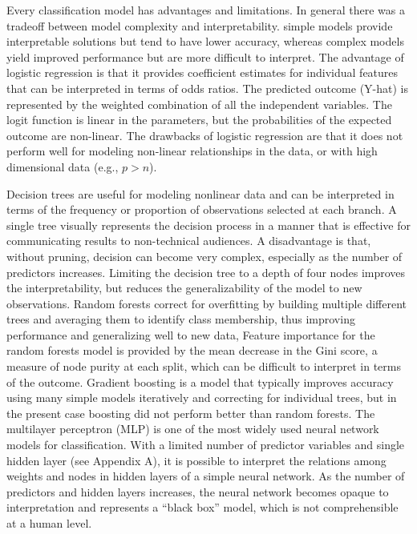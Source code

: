 \documentclass[sigconf]{acmart}
\begin{document}
Every classification model has advantages and limitations. In general there
was a tradeoff between model complexity and interpretability. simple models 
provide interpretable solutions but tend to have lower accuracy, whereas
complex models yield improved performance but are more difficult to interpret. 
The advantage of logistic regression is that it provides coefficient estimates 
for individual features that can be interpreted in terms of odds ratios. The
predicted outcome (Y-hat) is represented by the weighted combination of all 
the independent variables. The logit function is linear in the parameters, 
but the probabilities of the expected outcome are non-linear. The drawbacks of 
logistic regression are that it does not perform well for modeling non-linear 
relationships in the data, or with high dimensional data (e.g., $p>n$). 

Decision trees are useful for modeling nonlinear data and can be 
interpreted in terms of the frequency or proportion of observations selected 
at each branch. A single tree visually represents the decision process in a 
manner that is effective for communicating results to non-technical audiences. 
A disadvantage is that, without pruning, decision can become very complex, 
especially as the number of predictors increases. Limiting the decision tree 
to a depth of four nodes improves the interpretability, but reduces the 
generalizability of the model to new observations. Random forests correct for 
overfitting by building multiple different trees and averaging them to identify 
class membership, thus improving performance and generalizing well to new data,
Feature importance for the random forests model is provided by the mean 
decrease in the Gini score, a measure of node purity at each split, which can
be difficult to interpret in terms of the outcome. Gradient boosting is a model
that typically improves accuracy using many simple models iteratively and 
correcting for individual trees, but in the present case boosting did not 
perform better than random forests. The multilayer perceptron (MLP) is one of 
the most widely used neural network models for classification. With a limited 
number of predictor variables and single hidden layer (see Appendix A), it 
is possible to interpret the relations among weights and nodes in hidden 
layers of a simple neural network. As the number of predictors and hidden 
layers increases, the neural network becomes opaque to interpretation and 
represents a ``black box'' model, which is not comprehensible at a human level. 
\end{document}
